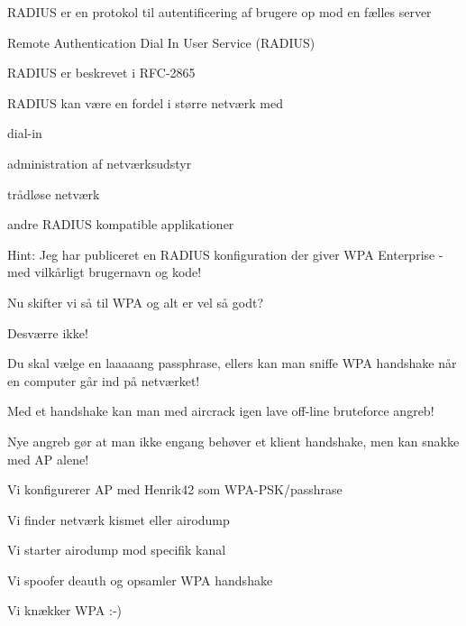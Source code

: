 \documentclass[Screen16to9,17pt]{foils}
\begin{document}
\begin{list1}
\item RADIUS er en protokol til autentificering af brugere op mod en
  fælles server
\item Remote Authentication Dial In User Service (RADIUS)
\item RADIUS er beskrevet i RFC-2865
\item RADIUS kan være en fordel i større netværk med
\begin{list2}
\item dial-in
\item administration af netværksudstyr
\item trådløse netværk
\item andre RADIUS kompatible applikationer
\end{list2}
\item {}
\end{list1}

Hint: Jeg har publiceret en RADIUS konfiguration der giver WPA Enterprise - med vilkårligt brugernavn og kode!\\




\begin{list1}
\item Nu skifter vi så til WPA og alt er vel så godt?
\pause
\item Desværre ikke!
\item Du skal vælge en laaaaang passphrase, ellers kan man sniffe WPA
  handshake når en computer går ind på netværket!
\item Med et handshake kan man med aircrack igen lave off-line
  bruteforce angreb!
  \item Nye angreb gør at man ikke engang behøver et klient handshake, men kan snakke med AP alene!
\end{list1}


\begin{list1}
\item Vi konfigurerer AP med Henrik42 som WPA-PSK/passhrase
\item Vi finder netværk kismet eller airodump
\item Vi starter airodump mod specifik kanal
\item Vi spoofer deauth og opsamler WPA handshake
\item Vi knækker WPA :-)
\end{list1}
\end{document}
